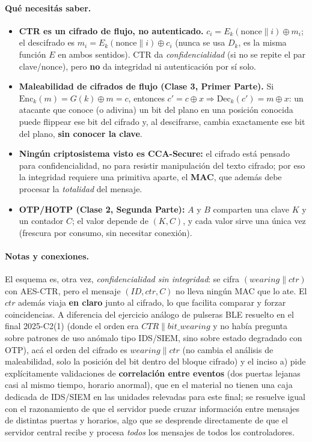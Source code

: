 \paragraph{Qué necesitás saber.}
\begin{itemize}
  \item \textbf{CTR es un cifrado de flujo, no autenticado.} $c_i = E_k(\text{nonce}
  \|i)\oplus m_i$; el descifrado es $m_i = E_k(\text{nonce}\|i)\oplus c_i$ (nunca se
  usa $D_k$, es la misma función $E$ en ambos sentidos). CTR da \emph{confidencialidad}
  (si no se repite el par clave/nonce), pero \textbf{no} da integridad ni
  autenticación por sí solo.
  \item \textbf{Maleabilidad de cifrados de flujo (Clase 3, Primer Parte).} Si
  $\mathrm{Enc}_k(m)=G(k)\oplus m=c$, entonces $c'=c\oplus x \Rightarrow
  \mathrm{Dec}_k(c')=m\oplus x$: un atacante que conoce (o adivina) un bit del plano
  en una posición conocida puede flippear ese bit del cifrado y, al descifrarse,
  cambia exactamente ese bit del plano, \textbf{sin conocer la clave}.
  \item \textbf{Ningún criptosistema visto es CCA-Secure:} el cifrado está pensado
  para confidencialidad, no para resistir manipulación del texto cifrado; por eso la
  integridad requiere una primitiva aparte, el \textbf{MAC}, que además debe procesar
  la \emph{totalidad} del mensaje.
  \item \textbf{OTP/HOTP (Clase 2, Segunda Parte):} $A$ y $B$ comparten una clave $K$
  y un contador $C$; el valor depende de $(K,C)$, y cada valor sirve una única vez
  (frescura por consumo, sin necesitar conexión).
\end{itemize}

\paragraph{Notas y conexiones.}
El esquema es, otra vez, \emph{confidencialidad sin integridad}: se cifra
$(\mathit{wearing}\|ctr)$ con AES-CTR, pero el mensaje $(ID,ctr,C)$ no lleva ningún
MAC que lo ate. El $ctr$ además viaja \textbf{en claro} junto al cifrado, lo que
facilita comparar y forzar coincidencias. A diferencia del ejercicio análogo de
pulseras BLE resuelto en el final 2025-C2(1) (donde el orden era $CTR\|bit\_wearing$
y no había pregunta sobre patrones de uso anómalo tipo IDS/SIEM, sino sobre estado
degradado con OTP), acá el orden del cifrado es $wearing\|ctr$ (no cambia el
análisis de maleabilidad, solo la posición del bit dentro del bloque cifrado) y el
inciso a) pide explícitamente validaciones de \textbf{correlación entre eventos}
(dos puertas lejanas casi al mismo tiempo, horario anormal), que en el material no
tienen una caja dedicada de IDS/SIEM en las unidades relevadas para este final; se
resuelve igual con el razonamiento de que el servidor puede cruzar información
entre mensajes de distintas puertas y horarios, algo que se desprende directamente
de que el servidor central recibe y procesa \emph{todos} los mensajes de todos los
controladores.

